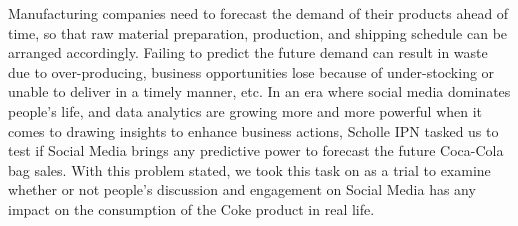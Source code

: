 \documentclass[12pt,oneside]{chicagocapstone}
\begin{document}
  \begin{executive}
    Manufacturing companies need to forecast the demand of their products
    ahead of time, so that raw material preparation, production, and
    shipping schedule can be arranged accordingly. Failing to predict the
    future demand can result in waste due to over-producing, business
    opportunities lose because of under-stocking or unable to deliver in a
    timely manner, etc. In an era where social media dominates people's
    life, and data analytics are growing more and more powerful when it
    comes to drawing insights to enhance business actions, Scholle IPN
    tasked us to test if Social Media brings any predictive power to
    forecast the future Coca-Cola bag sales. With this problem stated, we
    took this task on as a trial to examine whether or not people's
    discussion and engagement on Social Media has any impact on the
    consumption of the Coke product in real life.
    

\end{executive}
\end{document}
